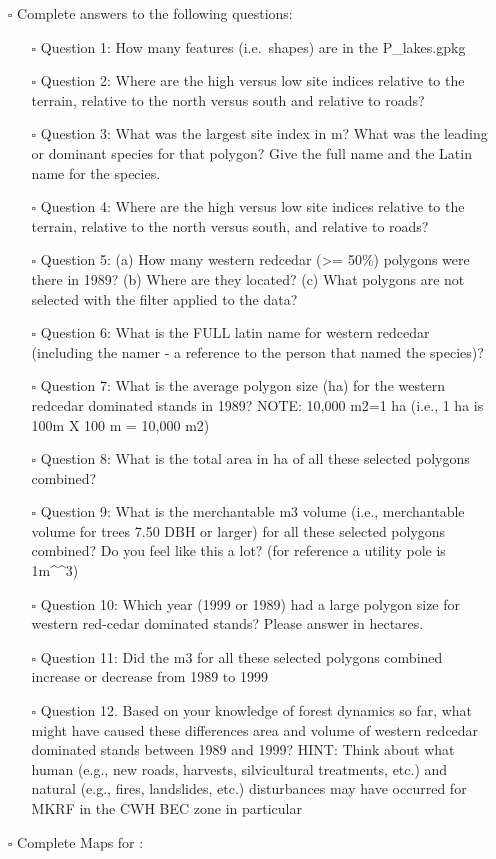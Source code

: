 \documentclass[
  letterpaper,
]{book}
\providecommand{\tightlist}{%
  \setlength{\itemsep}{0pt}\setlength{\parskip}{0pt}}\usepackage{longtable,booktabs,array}
\begin{document}
\begin{itemize}
\item[$\square$]
  Complete answers to the following questions:

  \begin{itemize}
  \tightlist
  \item[$\square$]
    Question 1: How many features (i.e.~shapes) are in the P\_lakes.gpkg
  \item[$\square$]
    Question 2: Where are the high versus low site indices relative to
    the terrain, relative to the north versus south and relative to
    roads?
  \item[$\square$]
    Question 3: What was the largest site index in m? What was the
    leading or dominant species for that polygon? Give the full name and
    the Latin name for the species.
  \item[$\square$]
    Question 4: Where are the high versus low site indices relative to
    the terrain, relative to the north versus south, and relative to
    roads?
  \item[$\square$]
    Question 5: (a) How many western redcedar (\textgreater= 50\%)
    polygons were there in 1989? (b) Where are they located? (c) What
    polygons are not selected with the filter applied to the data?
  \item[$\square$]
    Question 6: What is the FULL latin name for western redcedar
    (including the namer - a reference to the person that named the
    species)?
  \item[$\square$]
    Question 7: What is the average polygon size (ha) for the western
    redcedar dominated stands in 1989? NOTE: 10,000 m2=1 ha (i.e., 1 ha
    is 100m X 100 m = 10,000 m2)
  \item[$\square$]
    Question 8: What is the total area in ha of all these selected
    polygons combined?
  \item[$\square$]
    Question 9: What is the merchantable m3 volume (i.e., merchantable
    volume for trees 7.50 DBH or larger) for all these selected polygons
    combined? Do you feel like this a lot? (for reference a utility pole
    is 1m\^{}\^{}3)
  \item[$\square$]
    Question 10: Which year (1999 or 1989) had a large polygon size for
    western red-cedar dominated stands? Please answer in hectares.
  \item[$\square$]
    Question 11: Did the m3 for all these selected polygons combined
    increase or decrease from 1989 to 1999
  \item[$\square$]
    Question 12. Based on your knowledge of forest dynamics so far, what
    might have caused these differences area and volume of western
    redcedar dominated stands between 1989 and 1999? HINT: Think about
    what human (e.g., new roads, harvests, silvicultural treatments,
    etc.) and natural (e.g., fires, landslides, etc.) disturbances may
    have occurred for MKRF in the CWH BEC zone in particular
  \end{itemize}
\item[$\square$]
  Complete Maps for :


\end{itemize}
\end{document}
